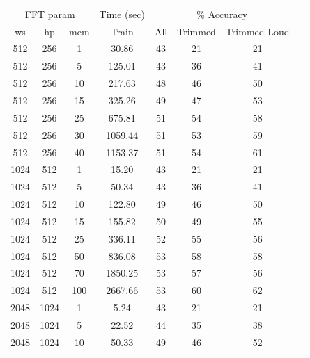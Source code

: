 \begin{table}
\begin{tabular}{|c|c|c|c|c|c|c|c}
\hline
\multicolumn{3}{|c|}{FFT param} & \multicolumn{1}{c|}{Time (sec)} & \multicolumn{3}{c|}{\% Accuracy} \\
\hhline{|-|-|-|-|-|-|-|-|}
ws & hp & mem & Train & All & Trimmed & Trimmed Loud \\
\hhline{|=|=|=|=|=|=|=|=|}
512 & 256 & 1      &        30.86  &    43   &  21  &  21 \\
512 & 256 & 5      &       125.01  &    43   &  36  &  41 \\
512 & 256 & 10     &       217.63  &    48   &  46  &  50 \\
512 & 256 & 15     &       325.26  &    49   &  47  &  53 \\
512 & 256 & 25     &       675.81  &    51   &  54  &  58 \\
512 & 256 & 30     &      1059.44  &    51   &  53  &  59 \\
512 & 256 & 40     &      1153.37  &    51   &  54  &  61 \\
\hline
1024 & 512 & 1     &        15.20  &    43  &  21  &  21 \\
1024 & 512 & 5     &        50.34  &    43  &  36  &  41 \\
1024 & 512 & 10    &       122.80  &    49  &  46  &  50 \\
1024 & 512 & 15    &       155.82  &    50  &  49  &  55 \\
1024 & 512 & 25    &       336.11  &    52  &  55  &  56 \\
1024 & 512 & 50    &       836.08  &    53  &  58  &  58 \\
1024 & 512 & 70    &      1850.25  &    53  &  57  &  56 \\
1024 & 512 & 100   &      2667.66  &    53  &  60  &  62 \\
\hline
2048 & 1024 & 1    &         5.24  &    43 &  21  &  21 \\
2048 & 1024 & 5    &        22.52  &    44 &  35  &  38 \\
2048 & 1024 & 10   &        50.33  &    49 &  46  &  52 \\

\end{tabular}
\end{table}

